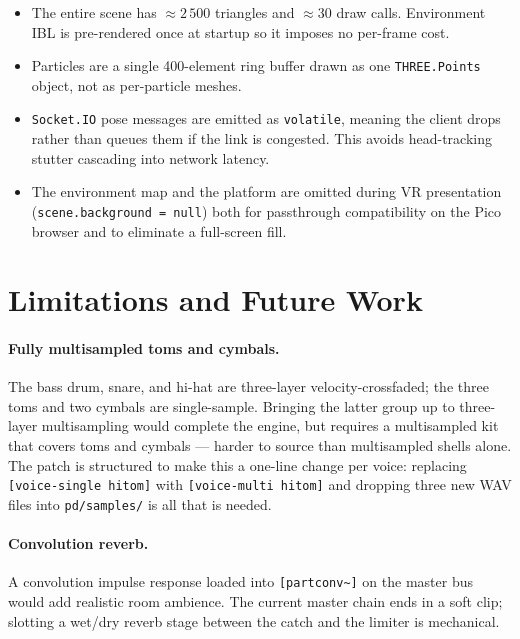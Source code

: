 \documentclass[11pt,a4paper]{article}
\begin{document}
\begin{itemize}[leftmargin=2em]
    \item The entire scene has $\approx 2\,500$ triangles and
          $\approx 30$ draw calls. Environment IBL is pre-rendered
          once at startup so it imposes no per-frame cost.
    \item Particles are a single 400-element ring buffer drawn as
          one \texttt{THREE.Points} object, not as per-particle
          meshes.
    \item \texttt{Socket.IO} pose messages are emitted as
          \texttt{volatile}, meaning the client drops rather than
          queues them if the link is congested. This avoids
          head-tracking stutter cascading into network latency.
    \item The environment map and the platform are omitted during
          VR presentation (\texttt{scene.background = null}) both
          for passthrough compatibility on the Pico browser and to
          eliminate a full-screen fill.
\end{itemize}

\section{Limitations and Future Work}

\paragraph{Fully multisampled toms and cymbals.}
The bass drum, snare, and hi-hat are three-layer velocity-crossfaded;
the three toms and two cymbals are single-sample. Bringing the latter
group up to three-layer multisampling would complete the engine, but
requires a multisampled kit that covers toms and cymbals --- harder
to source than multisampled shells alone. The patch is structured to
make this a one-line change per voice: replacing
\texttt{[voice-single hitom]} with \texttt{[voice-multi hitom]} and
dropping three new WAV files into \texttt{pd/samples/} is all that is
needed.

\paragraph{Convolution reverb.}
A convolution impulse response loaded into \texttt{[partconv\~{}]} on
the master bus would add realistic room ambience. The current master
chain ends in a soft clip; slotting a wet/dry reverb stage between
the catch and the limiter is mechanical.
\end{document}
